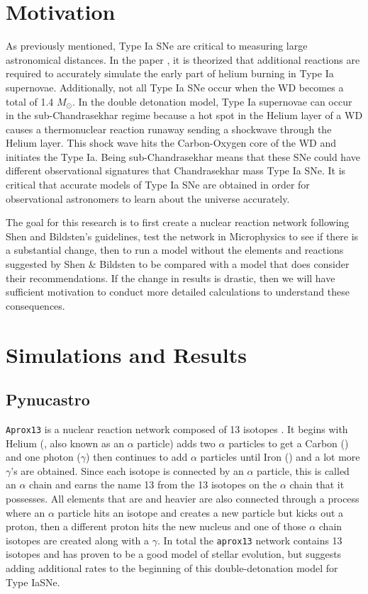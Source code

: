 \documentclass[preprint]{aastex62}
\begin{document}
\section{Motivation}
  
  As previously mentioned, Type Ia SNe are critical to measuring large astronomical distances. In the paper \citet{shenNbildsten}, it is theorized that additional reactions are required to accurately simulate the early part of helium burning in Type Ia supernovae. Additionally, not all Type Ia SNe occur when the WD becomes a total of 1.4 $M_{\odot}$. In the double detonation model, Type Ia supernovae can occur in the sub-Chandrasekhar regime because a hot spot in the Helium layer of a WD causes a thermonuclear reaction runaway sending a shockwave through the Helium layer. This shock wave hits the Carbon-Oxygen core of the WD and initiates the Type Ia. Being sub-Chandrasekhar means that these SNe could have different observational signatures that Chandrasekhar mass Type Ia SNe. It is critical that accurate models of Type Ia SNe are obtained in order for observational astronomers to learn about the universe accurately. 
  
  The goal for this research is to first create a nuclear reaction network following Shen and Bildsten's guidelines, test the network in Microphysics to see if there is a substantial change, then to run a model without the elements and reactions suggested by Shen \& Bildsten to be compared with a model that does consider their recommendations. If the change in results is drastic, then we will have sufficient motivation to conduct more detailed calculations to understand these consequences. 
  
\section{Simulations and Results}
  
  \subsection{Pynucastro}
    
    {\tt Aprox13} is a nuclear reaction network composed of 13 isotopes \citep{timmes}. It begins with Helium (, also known as an $\alpha$ particle) adds two $\alpha$ particles to get a Carbon () and one photon ($\gamma$) then continues to add $\alpha$ particles until Iron () and a lot more $\gamma$'s are obtained. Since each isotope is connected by an $\alpha$ particle, this is called an $\alpha$ chain and earns the name 13 from the 13 isotopes on the $\alpha$ chain that it possesses. All elements that are  and heavier are also connected through a process where an $\alpha$ particle hits an isotope and creates a new particle but kicks out a proton, then a different proton hits the new nucleus and one of those $\alpha$ chain isotopes are created along with a $\gamma$. In total the {\tt aprox13} network contains 13 isotopes and has proven to be a good model of stellar evolution, but \citet{shenNbildsten} suggests adding additional rates to the beginning of this double-detonation model for Type IaSNe.  
    
\end{document}
